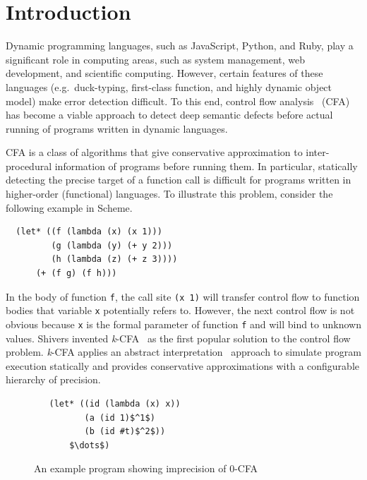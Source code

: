 \documentclass[12pt]{report}
\begin{document}
\chapter{Introduction}
\label{Introduction}
Dynamic programming languages, such as JavaScript, Python, and Ruby, play a significant role in computing areas, such as system management, web development, and scientific computing.
However, certain features of these languages (e.g.\ duck-typing, first-class function, and highly dynamic object model) make error detection difficult.
To this end, control flow analysis~\cite{midtgaard2012control}
 (CFA) has become a viable approach to detect deep semantic defects before actual running of programs written in dynamic languages.

CFA is a class of algorithms that give conservative approximation to inter-procedural information of programs
before running them.
In particular, statically detecting the precise target of a function call is difficult for programs written in
higher-order (functional) languages.
To illustrate this problem, consider the following example in Scheme.
\begin{lstlisting}
  (let* ((f (lambda (x) (x 1)))
         (g (lambda (y) (+ y 2)))
         (h (lambda (z) (+ z 3))))
      (+ (f g) (f h)))
\end{lstlisting}
In the body of function \verb|f|, the call site \verb|(x 1)| will transfer control flow to function bodies that variable \verb|x| potentially refers to.
However, the next control flow is not obvious because \verb|x| is the formal parameter of function \verb|f| and will bind to
unknown values.
Shivers invented \textit{k}-CFA~\cite{shivers1991control}
as the first popular solution to the control flow problem.
\textit{k}-CFA applies an abstract interpretation~\cite{cousot1977abstract} approach to simulate program execution statically and
provides conservative approximations with a configurable hierarchy of precision.
 \begin{figure}
 \begin{lstlisting}
   (let* ((id (lambda (x) x))
          (a (id 1)$^1$)
          (b (id #t)$^2$))
       $\dots$)
 \end{lstlisting}
 \caption{An example program showing imprecision of 0-CFA}
 \label{fig:eg1}
 \end{figure}
\end{document}
